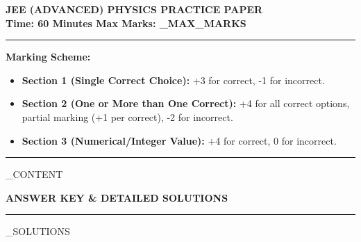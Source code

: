 \documentclass[11pt,a4paper]{article}
\begin{document}
\begin{center}
    {\LARGE \textbf{JEE (ADVANCED) PHYSICS PRACTICE PAPER}}\\[4pt]
    \textbf{Time: 60 Minutes \qquad Max Marks: \VAR_MAX_MARKS}
    \rule{\textwidth}{1pt}
\end{center}

\vspace{0.2cm}
\noindent \textbf{Marking Scheme:}
\begin{itemize}[noitemsep]
    \item \textbf{Section 1 (Single Correct Choice):} +3 for correct, -1 for incorrect.
    \item \textbf{Section 2 (One or More than One Correct):} +4 for all correct options, partial marking (+1 per correct), -2 for incorrect.
    \item \textbf{Section 3 (Numerical/Integer Value):} +4 for correct, 0 for incorrect.
\end{itemize}
\rule{\textwidth}{0.5pt}

\vspace{0.4cm}
\VAR_CONTENT

\newpage
\begin{center}
    {\Large \textbf{ANSWER KEY \& DETAILED SOLUTIONS}}
    \rule{\textwidth}{1pt}
\end{center}

\VAR_SOLUTIONS
\end{document}
